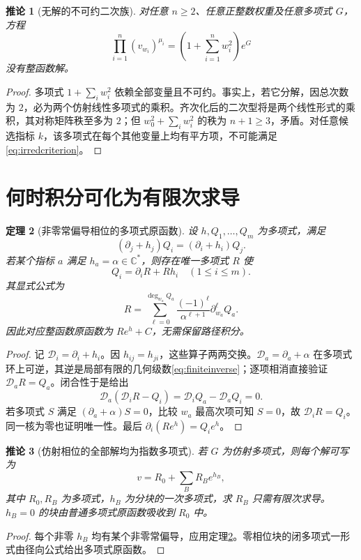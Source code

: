\documentclass[UTF8,11pt,a4paper,fontset=fandol]{ctexart}
\newtheorem{theorem}{定理}[section]
\newtheorem{corollary}[theorem]{推论}
\theoremstyle{definition}\newtheorem{definition}[theorem]{定义}
\theoremstyle{remark}\newtheorem{remark}[theorem]{注}
\newcommand{\C}{\mathbb C}\newcommand{\N}{\mathbb N}
\begin{document}
\begin{corollary}[无解的不可约二次族]\label{cor:quadric}
对任意 $n\ge2$、任意正整数权重及任意多项式 $G$，方程
\[
\prod_{i=1}^n(v_{w_i})^{\mu_i}
=\left(1+\sum_{i=1}^n w_i^2\right)e^G
\]
没有整函数解。
\end{corollary}
\begin{proof}
多项式 $1+\sum_iw_i^2$ 依赖全部变量且不可约。事实上，若它分解，因总次数为 $2$，必为两个仿射线性多项式的乘积。齐次化后的二次型将是两个线性形式的乘积，其对称矩阵秩至多为 $2$；但 $w_0^2+\sum_iw_i^2$ 的秩为 $n+1\ge3$，矛盾。对任意候选指标 $k$，该多项式在每个其他变量上均有平方项，不可能满足\eqref{eq:irredcriterion}。
\end{proof}

\section{何时积分可化为有限次求导}\label{sec:elementary}
\begin{theorem}[非零常偏导相位的多项式原函数]\label{thm:elementary}
设 $h,Q_1,\ldots,Q_m$ 为多项式，满足
\[
(\partial_j+h_j)Q_i=(\partial_i+h_i)Q_j.
\]
若某个指标 $a$ 满足 $h_a=\alpha\in\C^*$，则存在唯一多项式 $R$ 使
\[
Q_i=\partial_iR+Rh_i\quad(1\le i\le m).
\]
其显式公式为
\begin{equation}\label{eq:finiteinverse}
R=\sum_{\ell=0}^{\deg_{w_a}Q_a}
\frac{(-1)^\ell}{\alpha^{\ell+1}}\partial_{w_a}^{\ell}Q_a.
\end{equation}
因此对应整函数原函数为 $Re^h+C$，无需保留路径积分。
\end{theorem}
\begin{proof}
记 $\mathcal D_i=\partial_i+h_i$。因 $h_{ij}=h_{ji}$，这些算子两两交换。$\mathcal D_a=\partial_a+\alpha$ 在多项式环上可逆，其逆是局部有限的几何级数\eqref{eq:finiteinverse}；逐项相消直接验证 $\mathcal D_aR=Q_a$。闭合性于是给出
\[
\mathcal D_a(\mathcal D_iR-Q_i)
=\mathcal D_iQ_a-\mathcal D_aQ_i=0.
\]
若多项式 $S$ 满足 $(\partial_a+\alpha)S=0$，比较 $w_a$ 最高次项可知 $S=0$，故 $\mathcal D_iR=Q_i$。同一核为零也证明唯一性。最后 $\partial_i(Re^h)=Q_i e^h$。
\end{proof}

\begin{corollary}[仿射相位的全部解均为指数多项式]
若 $G$ 为仿射多项式，则每个解可写为
\[
v=R_0+\sum_B R_B e^{h_B},
\]
其中 $R_0,R_B$ 为多项式，$h_B$ 为分块的一次多项式，求 $R_B$ 只需有限次求导。$h_B=0$ 的块由普通多项式原函数吸收到 $R_0$ 中。
\end{corollary}
\begin{proof}
每个非零 $h_B$ 均有某个非零常偏导，应用定理\ref{thm:elementary}。零相位块的闭多项式一形式由径向公式给出多项式原函数。
\end{proof}
\end{document}
